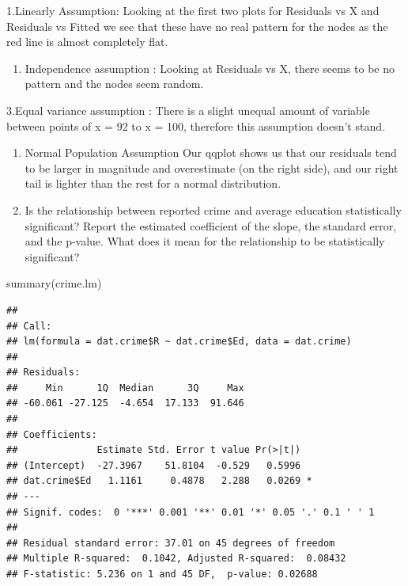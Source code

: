 \documentclass[
]{article}
\newenvironment{Shaded}{\begin{snugshade}}{\end{snugshade}}
\newcommand{\FunctionTok}[1]{\textcolor[rgb]{0.00,0.00,0.00}{#1}}
\newcommand{\NormalTok}[1]{#1}
\providecommand{\tightlist}{%
  \setlength{\itemsep}{0pt}\setlength{\parskip}{0pt}}
\begin{document}
1.Linearly Assumption: Looking at the first two plots for Residuals vs X
and Residuals vs Fitted we see that these have no real pattern for the
nodes as the red line is almost completely flat.

\begin{enumerate}
\def\labelenumi{\arabic{enumi}.}
\setcounter{enumi}{1}
\tightlist
\item
  Independence assumption : Looking at Residuals vs X, there seems to be
  no pattern and the nodes seem random.
\end{enumerate}

3.Equal variance assumption : There is a slight unequal amount of
variable between points of x = 92 to x = 100, therefore this assumption
doesn't stand.

\begin{enumerate}
\def\labelenumi{\arabic{enumi}.}
\setcounter{enumi}{3}
\item
  Normal Population Assumption Our qqplot shows us that our residuals
  tend to be larger in magnitude and overestimate (on the right side),
  and our right tail is lighter than the rest for a normal distribution.
\item
  Is the relationship between reported crime and average education
  statistically significant? Report the estimated coefficient of the
  slope, the standard error, and the p-value. What does it mean for the
  relationship to be statistically significant?
\end{enumerate}

\begin{Shaded}
\begin{Highlighting}[]
\FunctionTok{summary}\NormalTok{(crime.lm)}
\end{Highlighting}
\end{Shaded}

\begin{verbatim}
## 
## Call:
## lm(formula = dat.crime$R ~ dat.crime$Ed, data = dat.crime)
## 
## Residuals:
##     Min      1Q  Median      3Q     Max 
## -60.061 -27.125  -4.654  17.133  91.646 
## 
## Coefficients:
##              Estimate Std. Error t value Pr(>|t|)  
## (Intercept)  -27.3967    51.8104  -0.529   0.5996  
## dat.crime$Ed   1.1161     0.4878   2.288   0.0269 *
## ---
## Signif. codes:  0 '***' 0.001 '**' 0.01 '*' 0.05 '.' 0.1 ' ' 1
## 
## Residual standard error: 37.01 on 45 degrees of freedom
## Multiple R-squared:  0.1042, Adjusted R-squared:  0.08432 
## F-statistic: 5.236 on 1 and 45 DF,  p-value: 0.02688
\end{verbatim}
\end{document}
